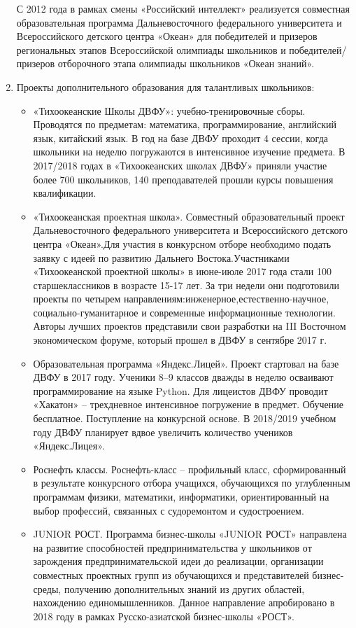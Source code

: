 \begin{enumerate}
    С 2012 года в рамках смены «Российский интеллект» реализуется совместная образовательная программа Дальневосточного федерального университета и Всероссийского детского центра «Океан» для победителей и призеров региональных этапов Всероссийской олимпиады школьников и победителей/призеров отборочного этапа олимпиады школьников «Океан знаний».
    \item Проекты дополнительного образования для талантливых школьников:
    \begin{itemize}
        \item «Тихоокеанские Школы ДВФУ»: учебно-тренировочные сборы. Проводятся по предметам: математика, программирование, английский язык, китайский язык. В год на базе ДВФУ проходит 4 сессии, когда школьники на неделю погружаются в интенсивное изучение предмета. В 2017/2018  годах в «Тихоокеанских школах ДВФУ» приняли участие более 700 школьников, 140 преподавателей прошли курсы повышения квалификации.
        \item «Тихоокеанская проектная школа». Совместный образовательный проект Дальневосточного федерального университета и Всероссийского детского центра «Океан».Для участия в конкурсном отборе необходимо подать заявку с идеей по развитию Дальнего Востока.Участниками «Тихоокеанской проектной школы» в июне-июле 2017 года стали 100 старшеклассников в возрасте 15-17 лет. За три недели они подготовили проекты по четырем направлениям:инженерное,естественно-научное, социально-гуманитарное и современные информационные технологии. Авторы лучших проектов представили свои разработки на III Восточном экономическом форуме, который прошел в ДВФУ в сентябре 2017 г.
        \item Образовательная программа «Яндекс.Лицей». Проект стартовал на базе ДВФУ в 2017 году. Ученики 8–9 классов дважды в неделю осваивают программирование на языке Python. Для лицеистов ДВФУ проводит «Хакатон» – трехдневное интенсивное погружение в предмет.  Обучение бесплатное. Поступление на конкурсной основе. В 2018/2019 учебном году ДВФУ планирует вдвое увеличить количество учеников «Яндекс.Лицея».
        \item Роснефть классы. Роснефть-класс – профильный класс, сформированный в результате конкурсного отбора учащихся, обучающихся по углубленным программам физики, математики, информатики, ориентированный на выбор профессий, связанных с судоремонтом и судостроением.
        \item JUNIOR РОСТ. Программа бизнес-школы «JUNIOR РОСТ» направлена на развитие способностей предпринимательства у школьников от зарождения предпринимательской идеи до реализации, организации совместных проектных групп из обучающихся и представителей бизнес-среды, получению дополнительных знаний из других областей, нахождению единомышленников. Данное направление апробировано в 2018 году в рамках Русско-азиатской бизнес-школы «РОСТ».

\end{itemize}
\end{enumerate}
